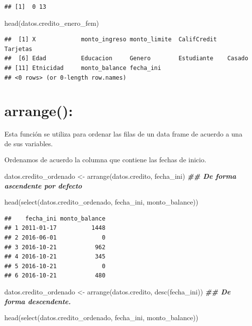 \documentclass[
  12pt,
]{book}
\newenvironment{Shaded}{\begin{snugshade}}{\end{snugshade}}
\newcommand{\DocumentationTok}[1]{\textcolor[rgb]{0.56,0.35,0.01}{\textbf{\textit{#1}}}}
\newcommand{\FunctionTok}[1]{\textcolor[rgb]{0.00,0.00,0.00}{#1}}
\newcommand{\NormalTok}[1]{#1}
\newcommand{\OtherTok}[1]{\textcolor[rgb]{0.56,0.35,0.01}{#1}}
\begin{document}
\begin{verbatim}
## [1]  0 13
\end{verbatim}

\begin{Shaded}
\begin{Highlighting}[]
\FunctionTok{head}\NormalTok{(datos.credito\_enero\_fem)}
\end{Highlighting}
\end{Shaded}

\begin{verbatim}
##  [1] X             monto_ingreso monto_limite  CalifCredit   Tarjetas     
##  [6] Edad          Educacion     Genero        Estudiante    Casado       
## [11] Etnicidad     monto_balance fecha_ini    
## <0 rows> (or 0-length row.names)
\end{verbatim}

\hypertarget{arrange}{%
\section{\texorpdfstring{\textbf{arrange()}:}{arrange():}}\label{arrange}}

Esta función se utiliza para ordenar las filas de un data frame de acuerdo a una de sus variables.

Ordenamos de acuerdo la columna que contiene las fechas de inicio.

\begin{Shaded}
\begin{Highlighting}[]
\NormalTok{datos.credito\_ordenado }\OtherTok{\textless{}{-}} \FunctionTok{arrange}\NormalTok{(datos.credito, fecha\_ini) }\DocumentationTok{\#\# De forma ascendente por defecto}

\FunctionTok{head}\NormalTok{(}\FunctionTok{select}\NormalTok{(datos.credito\_ordenado, fecha\_ini, monto\_balance))}
\end{Highlighting}
\end{Shaded}

\begin{verbatim}
##    fecha_ini monto_balance
## 1 2011-01-17          1448
## 2 2016-06-01             0
## 3 2016-10-21           962
## 4 2016-10-21           345
## 5 2016-10-21             0
## 6 2016-10-21           480
\end{verbatim}

\begin{Shaded}
\begin{Highlighting}[]
\NormalTok{datos.credito\_ordenado }\OtherTok{\textless{}{-}} \FunctionTok{arrange}\NormalTok{(datos.credito, }\FunctionTok{desc}\NormalTok{(fecha\_ini)) }\DocumentationTok{\#\# De forma descendente.}

\FunctionTok{head}\NormalTok{(}\FunctionTok{select}\NormalTok{(datos.credito\_ordenado, fecha\_ini, monto\_balance))}
\end{Highlighting}
\end{Shaded}
\end{document}
